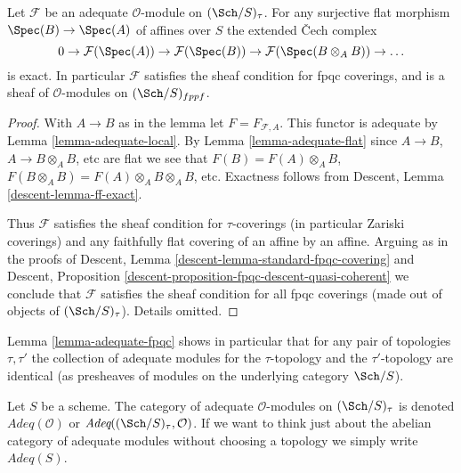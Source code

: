 \begin{lemma}
\label{lemma-adequate-fpqc}
Let $\mathcal{F}$ be an adequate $\mathcal{O}$-module on
$(\Sch/S)_\tau$. For any surjective flat morphism
$\Spec(B) \to \Spec(A)$ of affines over $S$
the extended {\v C}ech complex
$$
0 \to \mathcal{F}(\Spec(A)) \to
\mathcal{F}(\Spec(B)) \to
\mathcal{F}(\Spec(B \otimes_A B)) \to \ldots
$$
is exact. In particular $\mathcal{F}$ satisfies the sheaf condition
for fpqc coverings, and is a sheaf of $\mathcal{O}$-modules
on $(\Sch/S)_{fppf}$.
\end{lemma}

\begin{proof}
With $A \to B$ as in the lemma let $F = F_{\mathcal{F}, A}$. This functor
is adequate by
Lemma \ref{lemma-adequate-local}.
By
Lemma \ref{lemma-adequate-flat}
since $A \to B$, $A \to B \otimes_A B$, etc are flat we see that
$F(B) = F(A) \otimes_A B$,
$F(B \otimes_A B) = F(A) \otimes_A B \otimes_A B$, etc.
Exactness follows from
Descent, Lemma \ref{descent-lemma-ff-exact}.

\medskip\noindent
Thus $\mathcal{F}$ satisfies the sheaf condition for
$\tau$-coverings (in particular Zariski coverings) and any faithfully
flat covering of an affine by an affine. Arguing as in the proofs of
Descent, Lemma \ref{descent-lemma-standard-fpqc-covering}
and
Descent, Proposition \ref{descent-proposition-fpqc-descent-quasi-coherent}
we conclude that $\mathcal{F}$ satisfies the sheaf condition for all
fpqc coverings (made out of objects of $(\Sch/S)_\tau$).
Details omitted.
\end{proof}

\noindent
Lemma \ref{lemma-adequate-fpqc} shows in particular that
for any pair of topologies $\tau, \tau'$ the collection
of adequate modules for the $\tau$-topology and the $\tau'$-topology
are identical (as presheaves of modules on the underlying category $\Sch/S$).

\begin{definition}
\label{definition-category-adequate-modules}
Let $S$ be a scheme. The category of adequate $\mathcal{O}$-modules on
$(\Sch/S)_\tau$ is denoted {\it $\textit{Adeq}(\mathcal{O})$} or
{\it $\textit{Adeq}((\Sch/S)_\tau, \mathcal{O})$}. If we want to think just
about the abelian category of adequate modules without choosing a
topology we simply write {\it $\textit{Adeq}(S)$}.
\end{definition}

